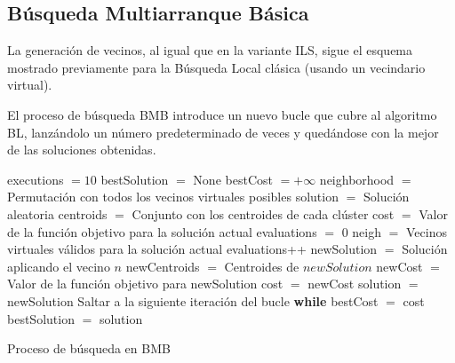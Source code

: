\newpage


\subsection{Búsqueda Multiarranque Básica}

La generación de vecinos, al igual que en la variante ILS, sigue el esquema mostrado previamente para la Búsqueda Local clásica (usando un vecindario virtual).

El proceso de búsqueda BMB introduce un nuevo bucle que cubre al algoritmo BL, lanzándolo un número predeterminado de veces y quedándose con la mejor de las soluciones obtenidas.

\vspace{\baselineskip}

\begin{algorithm}[H]
    \SetAlgoLined
        executions $= 10$ \;
        \BlankLine \BlankLine
        bestSolution $=$ None \;
        bestCost $= +\infty$ \;
        \BlankLine \BlankLine
        neighborhood $=$ Permutación con todos los vecinos virtuales posibles \;
        \BlankLine \BlankLine
         {
            solution $=$ Solución aleatoria \;
            centroids $=$ Conjunto con los centroides de cada clúster \;
            cost $=$ Valor de la función objetivo para la solución actual \;
            evaluations $=$ 0 \;
            \BlankLine \BlankLine
             {
                neigh $=$ Vecinos virtuales válidos para la solución actual \;
                 {
                    evaluations++ \;
                    newSolution $=$ Solución aplicando el vecino $n$ \;
                    newCentroids $=$ Centroides de $newSolution$ \;
                    newCost $=$ Valor de la función objetivo para newSolution \;
                    \BlankLine \BlankLine
                     {
                        cost $=$ newCost \;
                        solution $=$ newSolution \;
                        Saltar a la siguiente iteración del bucle \textbf{while} \;
                    }
                }
            }
            \BlankLine \BlankLine
             {
                bestCost $=$ cost \;
                bestSolution $=$ solution \;
            }
        }
    \caption{Proceso de búsqueda en BMB}
\end{algorithm}

